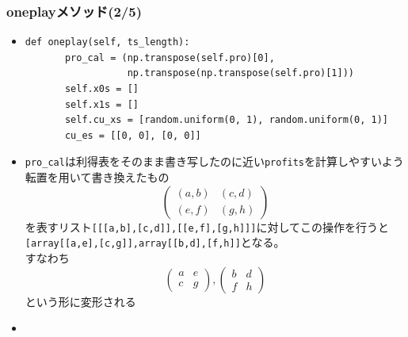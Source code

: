 \documentclass[dvipdfmx,fleqn]{beamer}
\begin{document}
\begin{frame}[fragile]%
\frametitle{oneplayメソッド(2/5)}
\begin{itemize}\setlength{\parskip}{0.5em}
\item
\footnotesize
\begin{verbatim}
def oneplay(self, ts_length):
       pro_cal = (np.transpose(self.pro)[0],
                  np.transpose(np.transpose(self.pro)[1]))
       self.x0s = []
       self.x1s = []
       self.cu_xs = [random.uniform(0, 1), random.uniform(0, 1)]
       cu_es = [[0, 0], [0, 0]]
 \end{verbatim}
\normalsize
\item
\verb|pro_cal|は利得表をそのまま書き写したのに近い\verb|profits|を計算しやすいよう転置を用いて書き換えたもの\pause
\footnotesize
\begin{equation*}
\begin{pmatrix}
(a,b) & (c,d)\\
(e,f) & (g,h)
\end{pmatrix}
\end{equation*}
\normalsize
を表すリスト\verb|[[[a,b],[c,d]],[[e,f],[g,h]]]|に対してこの操作を行うと\pause
\verb|[array[[a,e],[c,g]],array[[b,d],[f,h]]|となる。\\すなわち
\footnotesize
\begin{equation*}
\begin{pmatrix}
a & e\\
c & g
\end{pmatrix},
\begin{pmatrix}
b & d\\
f & h
\end{pmatrix}
\end{equation*}
\normalsize
という形に変形される
\item
\end{itemize}
\end{frame}
 
\end{document}
